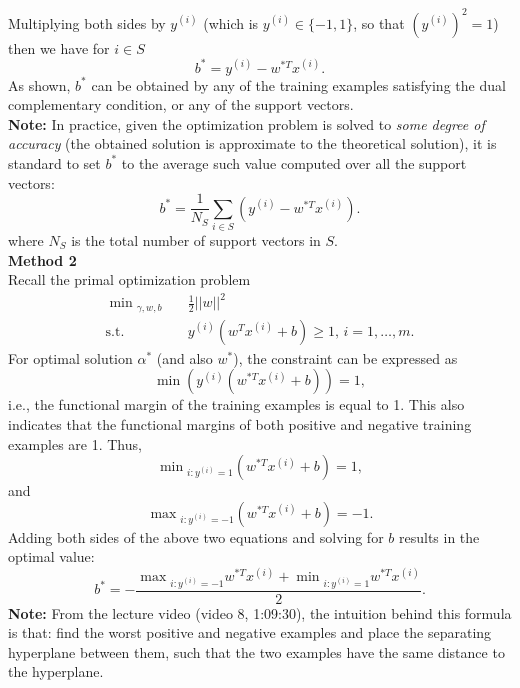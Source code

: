 \documentclass{article}
\begin{document}
Multiplying both sides by $y^{(i)}$ (which is $y^{(i)}\in \{-1,1\}$, so that $(y^{(i)})^2=1$) then we have for $i\in S$
\[
b^*=y^{(i)}-w^{*T}x^{(i)}.
\]
As shown, $b^*$ can be obtained by any of the training examples satisfying the dual complementary condition, or any of the support vectors.\\
\textbf{Note:} In practice, given the optimization problem is solved to \emph{some degree of accuracy} (the obtained solution is approximate to the theoretical solution), it is standard to set $b^*$ to the average such value computed over all the support vectors:
\[
b^*=\frac{1}{N_S}\sum_{i\in S}\left(y^{(i)}-w^{*T}x^{(i)}\right).
\]
where $N_S$ is the total number of support vectors in $S$.\\
\textbf{Method 2}\\
Recall the primal optimization problem
\[
\begin{split}
\min\!{}_{\gamma,w,b} & \quad \frac{1}{2}||w||^2\\
\text{s.t.} & \quad y^{(i)}(w^{T}x^{(i)}+b)\geq 1, \, i=1,\ldots,m.
\end{split}
\]
For optimal solution $\alpha^*$ (and also $w^*$), the constraint can be expressed as
\[
\min\left(y^{(i)}(w^{*T}x^{(i)}+b)\right)=1,
\]
i.e., the functional margin of the training examples is equal to 1. This also indicates that the functional margins of both positive and negative training examples are 1. Thus,
\[
\min\!{}_{i:y^{(i)}=1}\left(w^{*T}x^{(i)}+b\right)=1,
\]
and
\[
\max\!{}_{i:y^{(i)}=-1}\left(w^{*T}x^{(i)}+b\right)=-1.
\]
Adding both sides of the above two equations and solving for $b$ results in the optimal value:
\[
b^*=-\frac{\max\!{}_{i:y^{(i)}=-1}w^{*T}x^{(i)}+\min\!{}_{i:y^{(i)}=1}w^{*T}x^{(i)}}{2}.
\]
\textbf{Note: }From the lecture video (video 8, 1:09:30), the intuition behind this formula is that: find the worst positive and negative examples and place the separating hyperplane between them, such that the two examples have the same distance to the hyperplane.
\end{document}
